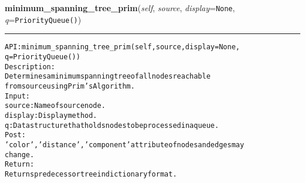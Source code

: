 \hspace{.8\funcindent}\begin{boxedminipage}{\funcwidth}

    \raggedright \textbf{minimum\_spanning\_tree\_prim}(\textit{self}, \textit{source}, \textit{display}={\tt None}, \textit{q}={\tt PriorityQueue()})

    \vspace{-1.5ex}

    \rule{\textwidth}{0.5\fboxrule}
\setlength{\parskip}{2ex}
\begin{alltt}

API: minimum\_spanning\_tree\_prim(self, source, display = None,
                                q = PriorityQueue())
Description:
Determines a minimum spanning tree of all nodes reachable
from source using Prim's Algorithm.
Input:
    source: Name of source node.
    display: Display method.
    q: Data structure that holds nodes to be processed in a queue.
Post:
    'color', 'distance', 'component' attribute of nodes and edges may
    change.
Return:
    Returns predecessor tree in dictionary format.
\end{alltt}

\setlength{\parskip}{1ex}
    \end{boxedminipage}

    \label{coinor:gimpy:graph:Graph:network_simplex}

    \vspace{0.5ex}

